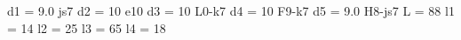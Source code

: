 d1  = 9.0   js7
d2  = 10    e10
d3  = 10    L0-k7
d4  = 10    F9-k7
d5  = 9.0   H8-js7
L   = 88
l1  = 14
l2  = 25
l3  = 65
l4  = 18
